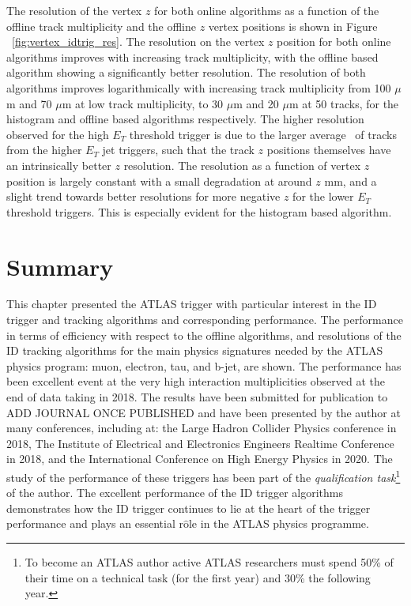 	The resolution of the vertex $z$ for both online algorithms as a function of the offline track multiplicity and the offline  $z$  vertex positions is shown in Figure ~\ref{fig:vertex_idtrig_res}.
	The resolution on the vertex  $z$  position for both online algorithms improves with increasing track multiplicity, with the offline based algorithm showing a significantly better resolution. The resolution of both algorithms improves logarithmically with increasing track multiplicity from 100 $\mu$m and 70 $\mu$m at low track multiplicity, to 30 $\mu$m and 20 $\mu$m at 50 tracks, for the histogram and offline based algorithms respectively. The higher resolution observed for the high $E_T$ threshold trigger is due to the larger average \pt\ of tracks from the higher $E_T$ jet triggers, such that the track  $z$  positions themselves have an intrinsically better  $z$  resolution.
	The resolution as a function of vertex  $z$  position is largely constant with a small degradation at around  $z$  mm, and a slight trend towards better resolutions for more negative  $z$  for the lower $E_T$ threshold triggers. This is especially evident for the histogram based algorithm.
	
	
	\section{Summary}
	This chapter presented the \ac{ATLAS} trigger with particular interest in the \ac{ID} trigger and tracking algorithms and corresponding performance. 
	The performance in terms of efficiency with respect to the offline algorithms, and resolutions of the \ac{ID} tracking algorithms for the main physics signatures needed by the \ac{ATLAS} physics program: muon, electron, tau, and b-jet, are shown. 
	The performance has been excellent event at the very high interaction multiplicities observed at the end of data taking in 2018. The results have been submitted for publication to \color{red} ADD JOURNAL ONCE PUBLISHED \color{black} and have been presented by the author at many conferences, including at: the Large Hadron Collider Physics conference in 2018, The Institute of Electrical and Electronics Engineers Realtime Conference in 2018, and the International Conference on High Energy Physics in 2020.
	The study of the performance of these triggers has been part of the \textit{qualification task}\footnote{To become an \ac{ATLAS} author active \ac{ATLAS} researchers must spend 50\% of their time on a technical task (for the first year) and 30\% the following year.}
	of the author.
	The excellent performance of the \ac{ID} trigger algorithms demonstrates how the \ac{ID} trigger continues to lie at the heart of the trigger performance and plays an essential r$\mathrm{\hat{o}}$le in the \ac{ATLAS} physics programme.